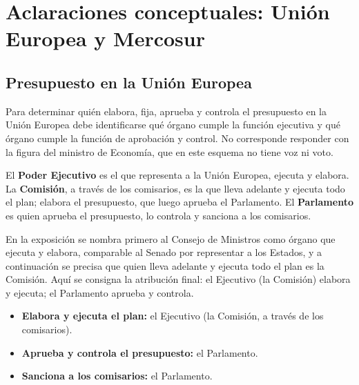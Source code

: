 \documentclass[12pt,oneside]{book}
\begin{document}

\chapter[Aclaraciones: UE y Mercosur]{Aclaraciones conceptuales: Unión Europea y Mercosur}

\section{Presupuesto en la Unión Europea}

Para determinar quién elabora, fija, aprueba y controla el presupuesto en la Unión Europea debe identificarse qué órgano cumple la función ejecutiva y qué órgano cumple la función de aprobación y control. No corresponde responder con la figura del ministro de Economía, que en este esquema no tiene voz ni voto.

El \textbf{Poder Ejecutivo} es el que representa a la Unión Europea, ejecuta y elabora. La \textbf{Comisión}, a través de los comisarios, es la que lleva adelante y ejecuta todo el plan; elabora el presupuesto, que luego aprueba el Parlamento. El \textbf{Parlamento} es quien aprueba el presupuesto, lo controla y sanciona a los comisarios.

\begin{note}
En la exposición se nombra primero al Consejo de Ministros como órgano que ejecuta y elabora, comparable al Senado por representar a los Estados, y a continuación se precisa que quien lleva adelante y ejecuta todo el plan es la Comisión. Aquí se consigna la atribución final: el Ejecutivo (la Comisión) elabora y ejecuta; el Parlamento aprueba y controla.
\end{note}

\begin{important}
\begin{itemize}
    \item \textbf{Elabora y ejecuta el plan:} el Ejecutivo (la Comisión, a través de los comisarios).
    \item \textbf{Aprueba y controla el presupuesto:} el Parlamento.
    \item \textbf{Sanciona a los comisarios:} el Parlamento.
\end{itemize}
\end{important}
\end{document}
